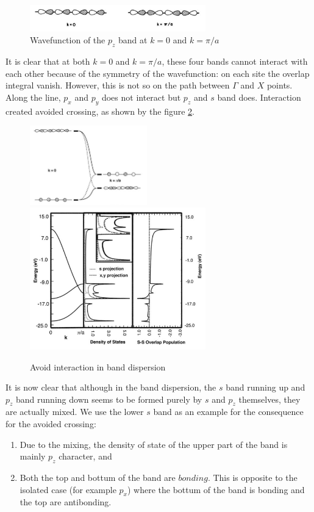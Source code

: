 \documentclass{article}
\begin{document}
\begin{figure}[h!]
    \centering
    \includegraphics[width=3in]{figures/F_pz.png}
    \caption{Wavefunction of the $p_z$ band at $k=0$ and $k=\pi/a$}
    \label{F:pz}
\end{figure}

It is clear that at both $k=0$ and $k=\pi/a$, these four bands cannot interact with each other 
because of the symmetry of the wavefunction: on each site the overlap integral vanish. However, 
this is not so on the path between $\Gamma$ and $X$ points. Along the line, $p_x$ and $p_y$ 
does not interact but $p_z$ and $s$ band does. Interaction created avoided crossing, as shown 
by the figure \ref{F:avoid_interaction}.

\begin{figure}[h!]
    \centering
    \includegraphics[width=2in]{figures/F_avoid_interaction_spz.png}
    \includegraphics[width=3in]{figures/F_avoid_interaction_dispersion.png}
    \caption{Avoid interaction in band dispersion}
    \label{F:avoid_interaction}
\end{figure}

It is now clear that although in the band dispersion, the $s$ band running up and $p_z$ band 
running down seems to be formed purely by $s$ and $p_z$ themselves, they are actually mixed. 
We use the lower $s$ band as an example for the consequence for the avoided crossing:
\begin{enumerate}
    \item Due to the mixing, the density of state of the upper part of the band is mainly $p_z$ character, and 
    \item Both the top and bottum of the band are $bonding$. This is opposite to the isolated case (for example $p_x$) where 
          the bottum of the band is bonding and the top are antibonding. 
\end{enumerate}
\end{document}
